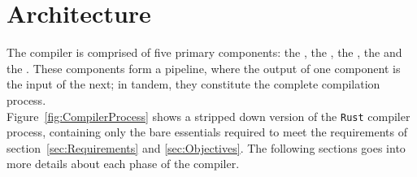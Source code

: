 \section{Architecture}
\label{sec:architecture}

The \lang{} compiler is comprised of five primary
components: the \lexer, the \parser, the \static, the \codeGen{} and the \gcc. These
components form a pipeline, where the output of one component is the input of the
next; in tandem, they constitute the complete compilation process. \\



Figure~\ref{fig:CompilerProcess} shows a stripped down version of the \texttt{Rust}
compiler process, containing only the bare essentials required to meet the
requirements of section~\ref{sec:Requirements} and \ref{sec:Objectives}. The
following sections goes into more details about each phase of the \lang{} compiler.






\newpage
